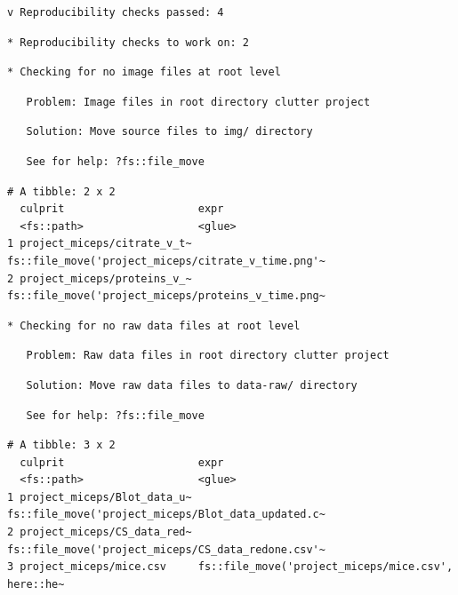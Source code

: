 \documentclass[12pt,twoside]{reedthesis}
\begin{document}
\begin{verbatim}
v Reproducibility checks passed: 4
\end{verbatim}
\begin{verbatim}
* Reproducibility checks to work on: 2
\end{verbatim}
\begin{verbatim}
* Checking for no image files at root level
\end{verbatim}
\begin{verbatim}
   Problem: Image files in root directory clutter project
\end{verbatim}
\begin{verbatim}
   Solution: Move source files to img/ directory
\end{verbatim}
\begin{verbatim}
   See for help: ?fs::file_move
\end{verbatim}
\begin{verbatim}
# A tibble: 2 x 2
  culprit                     expr                                              
  <fs::path>                  <glue>                                            
1 project_miceps/citrate_v_t~ fs::file_move('project_miceps/citrate_v_time.png'~
2 project_miceps/proteins_v_~ fs::file_move('project_miceps/proteins_v_time.png~
\end{verbatim}
\begin{verbatim}
* Checking for no raw data files at root level
\end{verbatim}
\begin{verbatim}
   Problem: Raw data files in root directory clutter project
\end{verbatim}
\begin{verbatim}
   Solution: Move raw data files to data-raw/ directory
\end{verbatim}
\begin{verbatim}
   See for help: ?fs::file_move
\end{verbatim}
\begin{verbatim}
# A tibble: 3 x 2
  culprit                     expr                                              
  <fs::path>                  <glue>                                            
1 project_miceps/Blot_data_u~ fs::file_move('project_miceps/Blot_data_updated.c~
2 project_miceps/CS_data_red~ fs::file_move('project_miceps/CS_data_redone.csv'~
3 project_miceps/mice.csv     fs::file_move('project_miceps/mice.csv', here::he~
\end{verbatim}
\normalsize
\end{document}
